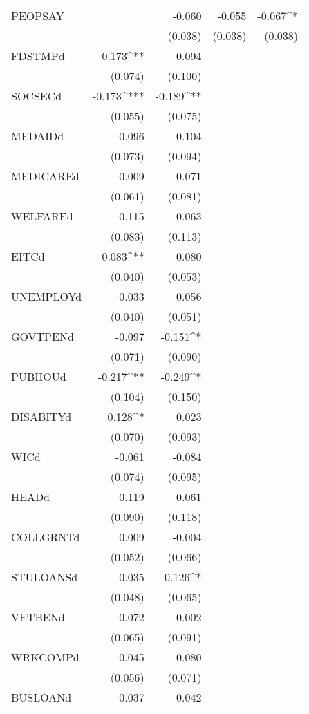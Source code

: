 \begin{table}[!htbp]
\begin{tabular}{@{\extracolsep{5pt}}lD{.}{.}{-3} D{.}{.}{-3} D{.}{.}{-3} D{.}{.}{-3} }
  PEOPSAY &  & -0.060 & -0.055 & -0.067^{*} \\ 
  &  & (0.038) & (0.038) & (0.038) \\ 
  FDSTMPd & 0.173^{**} & 0.094 &  &  \\ 
  & (0.074) & (0.100) &  &  \\ 
  SOCSECd & -0.173^{***} & -0.189^{**} &  &  \\ 
  & (0.055) & (0.075) &  &  \\ 
  MEDAIDd & 0.096 & 0.104 &  &  \\ 
  & (0.073) & (0.094) &  &  \\ 
  MEDICAREd & -0.009 & 0.071 &  &  \\ 
  & (0.061) & (0.081) &  &  \\ 
  WELFAREd & 0.115 & 0.063 &  &  \\ 
  & (0.083) & (0.113) &  &  \\ 
  EITCd & 0.083^{**} & 0.080 &  &  \\ 
  & (0.040) & (0.053) &  &  \\ 
  UNEMPLOYd & 0.033 & 0.056 &  &  \\ 
  & (0.040) & (0.051) &  &  \\ 
  GOVTPENd & -0.097 & -0.151^{*} &  &  \\ 
  & (0.071) & (0.090) &  &  \\ 
  PUBHOUd & -0.217^{**} & -0.249^{*} &  &  \\ 
  & (0.104) & (0.150) &  &  \\ 
  DISABITYd & 0.128^{*} & 0.023 &  &  \\ 
  & (0.070) & (0.093) &  &  \\ 
  WICd & -0.061 & -0.084 &  &  \\ 
  & (0.074) & (0.095) &  &  \\ 
  HEADd & 0.119 & 0.061 &  &  \\ 
  & (0.090) & (0.118) &  &  \\ 
  COLLGRNTd & 0.009 & -0.004 &  &  \\ 
  & (0.052) & (0.066) &  &  \\ 
  STULOANSd & 0.035 & 0.126^{*} &  &  \\ 
  & (0.048) & (0.065) &  &  \\ 
  VETBENd & -0.072 & -0.002 &  &  \\ 
  & (0.065) & (0.091) &  &  \\ 
  WRKCOMPd & 0.045 & 0.080 &  &  \\ 
  & (0.056) & (0.071) &  &  \\ 
  BUSLOANd & -0.037 & 0.042 &  &  \\ 

\end{tabular}
\end{table}
